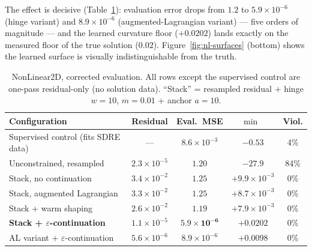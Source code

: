 \documentclass[11pt,a4paper]{article}
\DeclareMathOperator{\lammin}{\lambda_{\min}}
\begin{document}
The effect is decisive (Table~\ref{tab:nl}): evaluation error drops from
$1.2$ to $5.9\times10^{-6}$ (hinge variant) and $8.9\times10^{-6}$
(augmented-Lagrangian variant) --- five orders of magnitude --- and the
learned curvature floor ($+0.0202$) lands exactly on the measured floor of
the true solution ($0.02$). Figure~\ref{fig:nl-surfaces} (bottom) shows the
learned surface is visually indistinguishable from the truth.

\begin{table}[t]
\centering\small
\caption{NonLinear2D, corrected evaluation. All rows except the supervised
control are one-pass residual-only (no solution data). ``Stack'' = resampled
residual + hinge $w{=}10$, $m{=}0.01$ + anchor $a{=}10$.}
\label{tab:nl}
\begin{tabular}{lcccc}
\toprule
Configuration & Residual & Eval.\ MSE & $\min\lammin$ & Viol. \\
\midrule
Supervised control (fits SDRE data)        & ---                & $8.6\times10^{-3}$ & $-0.53$ & 4\% \\
\midrule
Unconstrained, resampled                   & $2.3\times10^{-5}$ & $1.20$ & $-27.9$ & 84\% \\
Stack, no continuation                     & $3.4\times10^{-2}$ & $1.25$ & $+9.9\times10^{-3}$ & 0\% \\
Stack, augmented Lagrangian                & $3.3\times10^{-2}$ & $1.25$ & $+8.7\times10^{-3}$ & 0\% \\
Stack + warm shaping                       & $2.6\times10^{-2}$ & $1.19$ & $+7.9\times10^{-3}$ & 0\% \\
\midrule
\textbf{Stack + $\varepsilon$-continuation}         & $1.1\times10^{-5}$ & $\mathbf{5.9\times10^{-6}}$ & $+0.0202$ & 0\% \\
AL variant + $\varepsilon$-continuation             & $5.6\times10^{-6}$ & $8.9\times10^{-6}$ & $+0.0098$ & 0\% \\
\bottomrule
\end{tabular}
\end{table}
\end{document}
